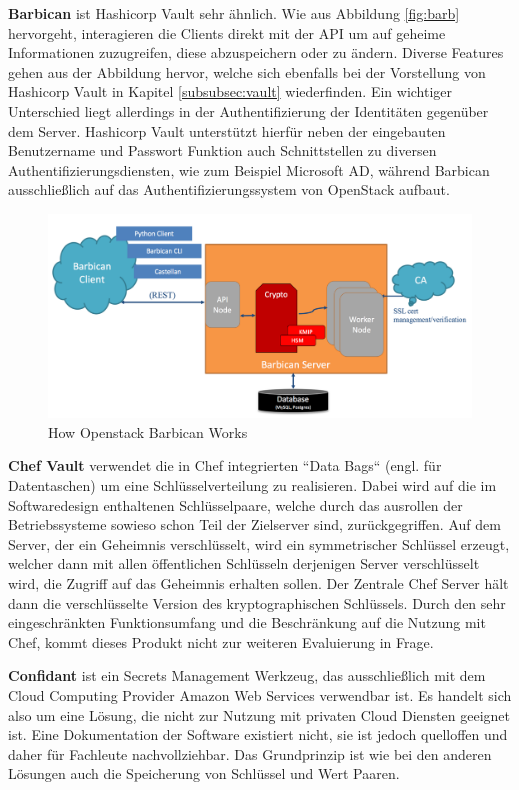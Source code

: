 \documentclass[
book,
a4paper,   
titlepage,  
halfparskip,
12pt        
]{scrartcl}
\begin{document}
\begin{onehalfspacing}
\textbf{Barbican} ist Hashicorp Vault sehr ähnlich. Wie aus Abbildung \vref{fig:barb} hervorgeht, interagieren die Clients direkt mit der \ac{API} um auf geheime Informationen zuzugreifen, diese abzuspeichern oder zu ändern. Diverse Features gehen aus der Abbildung hervor, welche sich ebenfalls bei der Vorstellung von Hashicorp Vault in Kapitel \vref{subsubsec:vault} wiederfinden. Ein wichtiger Unterschied liegt allerdings in der Authentifizierung der Identitäten gegenüber dem Server. Hashicorp Vault unterstützt hierfür neben der eingebauten Benutzername und Passwort Funktion auch Schnittstellen zu diversen Authentifizierungsdiensten, wie zum Beispiel Microsoft \ac{AD}, während Barbican ausschließlich auf das Authentifizierungssystem von OpenStack aufbaut.\cite[S. 4f]{barbican}
\begin{figure}[h]
	\centering
	\includegraphics[width=1\linewidth]{barbican}
	\caption[Barbican]{How Openstack Barbican Works \cite[S. 4]{barbican}}
	\label{fig:barb}
\end{figure}

\textbf{Chef Vault} verwendet die in Chef integrierten ``Data Bags`` (engl. für Datentaschen) um eine Schlüsselverteilung zu realisieren. Dabei wird auf die im Softwaredesign enthaltenen Schlüsselpaare, welche durch das ausrollen der Betriebssysteme sowieso schon Teil der Zielserver sind, zurückgegriffen. Auf dem Server, der ein Geheimnis verschlüsselt, wird ein symmetrischer Schlüssel erzeugt, welcher dann mit allen öffentlichen Schlüsseln derjenigen Server verschlüsselt wird, die Zugriff auf das Geheimnis erhalten sollen. Der Zentrale Chef Server hält dann die verschlüsselte Version des kryptographischen Schlüssels.\cite{chef} Durch den sehr eingeschränkten Funktionsumfang und die Beschränkung auf die Nutzung mit Chef, kommt dieses Produkt nicht zur weiteren Evaluierung in Frage.

\textbf{Confidant} ist ein Secrets Management Werkzeug, das ausschließlich mit dem Cloud Computing Provider Amazon Web Services verwendbar ist. Es handelt sich also um eine Lösung, die nicht zur Nutzung mit privaten Cloud Diensten geeignet ist. Eine Dokumentation der Software existiert nicht, sie ist jedoch quelloffen und daher für Fachleute nachvollziehbar. Das Grundprinzip ist wie bei den anderen Lösungen auch die Speicherung von Schlüssel und Wert Paaren.\cite{lyft}


\end{onehalfspacing}
\end{document}
